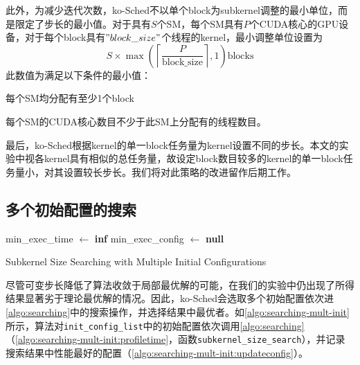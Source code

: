 此外，为减少迭代次数，ko-Sched不以单个block为subkernel调整的最小单位，而是限定了步长的最小值。对于具有$S$个SM，每个SM具有$P$个CUDA核心的GPU设备，对于每个block具有$"block\_size"$个线程的kernel，最小调整单位设置为
\begin{equation}
    S \times \max \left(\left\lceil \frac{P}{\text{block\_size}}\right\rceil  , 1\right) \text{blocks} \label{eq:searching:stepsize}
\end{equation}
此数值为满足以下条件的最小值：
\begin{enumerate*}[label=\roman*),itemjoin={\quad}]
    \item 每个SM均分配有至少1个block
    \item 每个SM的CUDA核心数目不少于此SM上分配有的线程数目。
\end{enumerate*}

最后，ko-Sched根据kernel的单一block任务量为kernel设置不同的步长。本文的实验中视各kernel具有相似的总任务量，故设定block数目较多的kernel的单一block任务量小，对其设置较长步长。我们将对此策略的改进留作后期工作。

\subsection{多个初始配置的搜索}

\begin{algorithm}[htbp]
    \SetAlgoLined
    min\_exec\_time $\gets$ \textbf{inf}\; \label{algo:searching-mult-init:initmin}
    min\_exec\_config $\gets$ \textbf{null}\; \label{algo:searching-mult-init:initminconfig}
    \;
    \caption{Subkernel Size Searching with Multiple Initial Configurations}
    \label{algo:searching-mult-init}
\end{algorithm}

尽管可变步长降低了算法收敛于局部最优解的可能，在我们的实验中仍出现了所得结果显著劣于理论最优解的情况。因此，ko-Sched会选取多个初始配置依次进\autoref{algo:searching}中的搜索操作，并选择结果中最优者。如\autoref{algo:searching-mult-init}所示，算法对\texttt{init\_config\_list}中的初始配置依次调用\autoref{algo:searching}（\autoref{algo:searching-mult-init:profiletime}，函数\texttt{subkernel\_size\_search}），并记录搜索结果中性能最好的配置（\autoref{algo:searching-mult-init:updateconfig}）。

